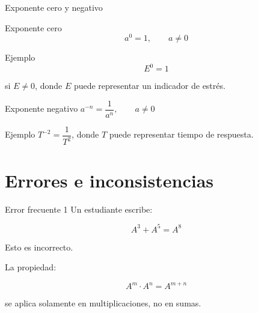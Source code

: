 \documentclass[handout,aspectratio=169]{beamer}
\begin{document}
	\begin{frame}{Exponente cero y negativo}
		\begin{block}{Exponente cero}
			\[
			a^0=1,\qquad a\neq 0
			\]
		\end{block}
		
		\pause
		
		\begin{exampleblock}{Ejemplo}
			\[
			E^0=1
			\]
			
			si \(E\neq 0\), donde \(E\) puede representar un indicador de estrés.
		\end{exampleblock}
		
		\pause
		
		\begin{block}{Exponente negativo}
			$a^{-n}=\dfrac{1}{a^n},	\qquad a\neq 0$
		\end{block}
		
		\pause
		
		\begin{exampleblock}{Ejemplo}
			$T^{-2}=\dfrac{1}{T^2}$, donde \(T\) puede representar tiempo de respuesta.
		\end{exampleblock}
	\end{frame}
	
	\section{Errores e inconsistencias}
	
	\begin{frame}{Error frecuente 1}
		Un estudiante escribe:
		
		\[
		A^3+A^5=A^8
		\]
		
		\pause
		
		\begin{alerta}
			Esto es incorrecto.
		\end{alerta}
		
		\pause
		
		La propiedad:
		
		\[
		A^m\cdot A^n=A^{m+n}
		\]
		
		se aplica solamente en multiplicaciones, no en sumas.
		
	\end{frame}
	
	
\end{document}
